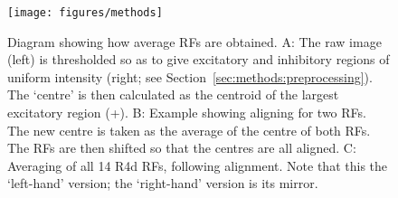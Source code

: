 \begin{figure}
\centering
\texttt{[image: figures/methods]}
\caption{Diagram showing how average RFs are obtained.
A: The raw image (left) is thresholded so as to give excitatory and inhibitory regions of uniform intensity (right; see Section~\ref{sec:methods:preprocessing}). The `centre' is then calculated as the centroid of the largest excitatory region (+).
B: Example showing aligning for two RFs. The new centre is taken as the average of the centre of both \acp{RF}. The \acp{RF} are then shifted so that the centres are all aligned.
C: Averaging of all 14 R4d RFs, following alignment. Note that this the `left-hand' version; the `right-hand' version is its mirror.}
\label{fig:averagekern}
\end{figure}
